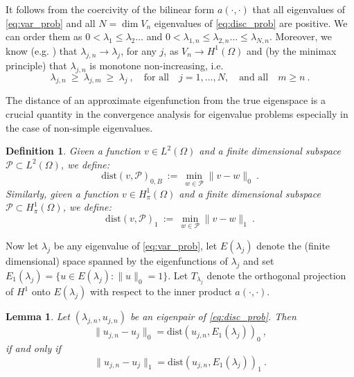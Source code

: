 \documentclass[preprint ,12pt]{elsarticle}
\newtheorem{lemma}[theorem]{Lemma}
\newtheorem{definition}[theorem]{Definition}
\newcommand{\cB}{{B}}
\begin{document}
It follows from the coercivity of the bilinear form $a(\cdot,\cdot)$ that
all eigenvalues of  \eqref{eq:var_prob} and all $N=\dim V_n$
eigenvalues of \eqref{eq:disc_prob} are positive.
We can order
them as $0 < \lambda_1 \leq \lambda_2 \ldots $ and $0 < \lambda_{1,n}
\leq \lambda_{2,n} \ldots \leq \lambda_{N,n}$. Moreover, we know (e.g. 
\cite{BaOs:89}) that  $\lambda_{j,n} \rightarrow \lambda_j$,
for any
$j$,  as  $V_n
\rightarrow H^1(\Omega)$ and (by the minimax principle) 
that $\lambda_{j,n}$ is monotone
non-increasing, i.e.
\begin{equation}\label{eq:minimax_shift}
\lambda_{j,n} \ \geq\  \lambda_{j,m}\  \geq\   \lambda_j \ , \quad
\text{for all} \quad j = 1, \ldots , N, \quad \text{and all} \quad
m \geq n \ .
\end{equation}

The distance of an approximate eigenfunction from the true eigenspace
is a crucial quantity in the convergence analysis for
eigenvalue problems  especially in the case of non-simple
eigenvalues.

\begin{definition}
\label{def:dist_l2}
Given a function $v\in L^2(\Omega)$ and a finite dimensional subspace $\mathcal{P}\subset L^2(\Omega)$, we define:
$$
\mathrm{dist}(v,\mathcal{P})_{0,\cB}\ :=\ \min_{ w\in\mathcal{P}}  \|v-w\|_{0} \ .
$$
Similarly, given a function $v\in H^1_\pi(\Omega)$ and a finite dimensional subspace $\mathcal{P}\subset H^1_\pi(\Omega)$, we define:
$$
\mathrm{dist}(v,\mathcal{P})_{1}\ :=\ \min_{ w\in\mathcal{P}}  \|v-w\|_{1} \ .
$$
\end{definition}

Now let $\lambda_j$ be any eigenvalue of 
\eqref{eq:var_prob},  let $E(\lambda_j)$ denote the (finite
dimensional) space spanned by  the eigenfunctions of  $\lambda_j$ and set
$E_1(\lambda_j)=\{u\in E(\lambda_j):
\|u\|_{0}=1\}$. 
{Let $T_{\lambda_j}$
  denote the orthogonal projection of $H^1$ onto $E(\lambda_j)$ with respect
  to the inner product $a(\cdot, \cdot)$.}

\begin{lemma}\label{lm:inf_l2_h1}
 Let $(\lambda_{j,n},u_{j,n})$ be an eigenpair of \eqref{eq:disc_prob}. Then
\begin{equation}\label{eq:inf_l2_h1_1}
\|u_{j,n}-u_j\|_{0} = \mathrm{dist}(u_{j,n},E_1(\lambda_j))_{0}\ ,
\end{equation}
if and only if
\begin{equation}\label{eq:inf_l2_h1_2}
\|{u_{j,n}-u_j}\|_{1}=\mathrm{dist}(u_{j,n},E_1(\lambda_j))_{1}\ .
\end{equation}

\end{lemma}
\end{document}

